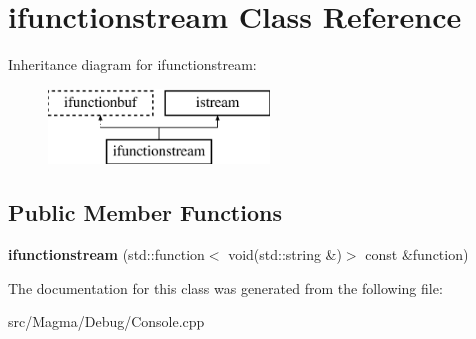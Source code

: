 \hypertarget{classifunctionstream}{}\section{ifunctionstream Class Reference}
\label{classifunctionstream}
Inheritance diagram for ifunctionstream\+:\begin{figure}[H]
\begin{center}
\leavevmode
\includegraphics[height=2.000000cm]{classifunctionstream}
\end{center}
\end{figure}
\subsection*{Public Member Functions}
\begin{DoxyCompactItemize}
\item 
\mbox{\label{classifunctionstream_ac41a505da4c3feef9bf26692dda6728e}} 
{\bfseries ifunctionstream} (std\+::function$<$ void(std\+::string \&)$>$ const \&function)
\end{DoxyCompactItemize}


The documentation for this class was generated from the following file\+:\begin{DoxyCompactItemize}
\item 
src/\+Magma/\+Debug/Console.\+cpp\end{DoxyCompactItemize}
